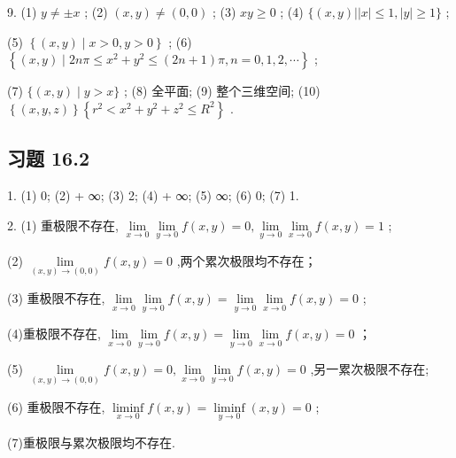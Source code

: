 9. (1) \(y \neq   \pm  x\) ; (2) \(\left( {x,y}\right)  \neq  \left( {0,0}\right)\) ; (3) \({xy} \geq  0\) ; (4) \(\{ \left( {x,y}\right) \left| \right| x\left| { \leq  1,}\right| y \mid   \geq  1\}\) ;

(5) \(\left\{  {\left( {x,y}\right)  \mid  x > 0,y > 0}\right\}\) ; (6) \(\left\{  {\left( {x,y}\right)  \mid  {2n\pi } \leq  {x}^{2} + {y}^{2} \leq  \left( {{2n} + 1}\right) \pi ,n = 0,1,2,\cdots }\right\}\) ;

(7) \(\{ \left( {x,y}\right)  \mid  y > x\}\) ; (8) 全平面; (9) 整个三维空间; (10) \(\left\{  \left( {x,y,z}\right) \right\}  \left\{  {{r}^{2} < {x}^{2} + {y}^{2} + {z}^{2} \leq  {R}^{2}}\right\}\) .

\subsection{习题 16.2}

1. (1) 0; (2) + ∞; (3) 2; (4) + ∞; (5) ∞; (6) 0; (7) 1.

2. (1) 重极限不存在, \(\mathop{\lim }\limits_{{x \rightarrow  0}}\mathop{\lim }\limits_{{y \rightarrow  0}}f\left( {x,y}\right)  = 0,\mathop{\lim }\limits_{{y \rightarrow  0}}\mathop{\lim }\limits_{{x \rightarrow  0}}f\left( {x,y}\right)  = 1\) ;

(2) \(\mathop{\lim }\limits_{{\left( {x,y}\right)  \rightarrow  \left( {0,0}\right) }}f\left( {x,y}\right)  = 0\) ,两个累次极限均不存在；

(3) 重极限不存在, \(\mathop{\lim }\limits_{{x \rightarrow  0}}\mathop{\lim }\limits_{{y \rightarrow  0}}f\left( {x,y}\right)  = \mathop{\lim }\limits_{{y \rightarrow  0}}\mathop{\lim }\limits_{{x \rightarrow  0}}f\left( {x,y}\right)  = 0\) ;

(4)重极限不存在, \(\mathop{\lim }\limits_{{x \rightarrow  0}}\mathop{\lim }\limits_{{y \rightarrow  0}}f\left( {x,y}\right)  = \mathop{\lim }\limits_{{y \rightarrow  0}}\mathop{\lim }\limits_{{x \rightarrow  0}}f\left( {x,y}\right)  = 0\) ；

(5) \(\mathop{\lim }\limits_{{\left( {x,y}\right)  \rightarrow  \left( {0,0}\right) }}f\left( {x,y}\right)  = 0,\mathop{\lim }\limits_{{x \rightarrow  0}}\mathop{\lim }\limits_{{y \rightarrow  0}}f\left( {x,y}\right)  = 0\) ,另一累次极限不存在;

(6) 重极限不存在, \(\mathop{\liminf }\limits_{{x \rightarrow  0}}f\left( {x,y}\right)  = \mathop{\liminf }\limits_{{y \rightarrow  0}}\left( {x,y}\right)  = 0\) ;

(7)重极限与累次极限均不存在.

